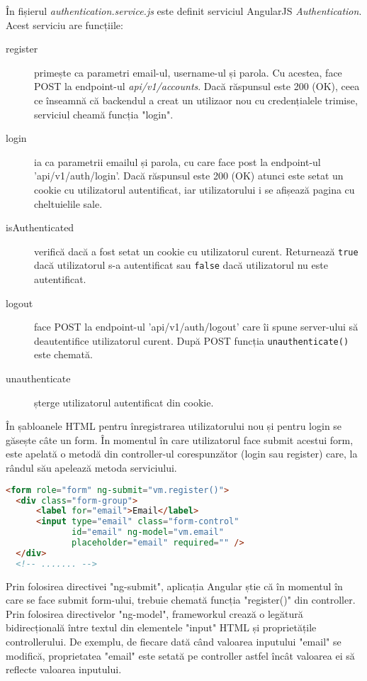 În fișierul \emph{authentication.service.js} este definit serviciul
AngularJS \emph{Authentication}. Acest serviciu are funcțiile:
\begin{description}
\item [register] primește ca parametri email-ul, username-ul și
parola. Cu acestea, face POST la endpoint-ul \emph{api/v1/accounts}.
Dacă răspunsul este 200 (OK), ceea ce înseamnă că backendul
a creat un utilizaor nou cu credențialele trimise,
serviciul cheamă funcția "login".
\item [login] ia ca parametrii emailul și parola, cu care
face post la endpoint-ul 'api/v1/auth/login'. Dacă răspunsul este
200 (OK) atunci este setat un cookie cu utilizatorul autentificat,
iar utilizatorului i se afișează pagina cu cheltuielile sale.
\item [isAuthenticated] verifică dacă a fost setat
un cookie cu utilizatorul curent. Returnează \texttt{true} dacă 
utilizatorul s-a autentificat sau \texttt{false} dacă utilizatorul
nu este autentificat.
\item [logout] face POST la endpoint-ul 'api/v1/auth/logout' care îi
spune server-ului să deautentifice utilizatorul curent. După POST 
funcția \texttt{unauthenticate()} este chemată.
\item [unauthenticate] șterge utilizatorul autentificat din cookie.
\end{description}



În șabloanele HTML pentru înregistrarea utilizatorului nou și pentru
login se găsește câte un form. În momentul în care utilizatorul face
submit acestui form, este apelată o metodă din controller-ul corespunzător
(login sau register) care, la rândul său apelează metoda serviciului.

\begin{lstlisting}[language=html, title=static/templates/authentication/register.html]
<form role="form" ng-submit="vm.register()">
  <div class="form-group">
      <label for="email">Email</label>
      <input type="email" class="form-control" 
             id="email" ng-model="vm.email"
             placeholder="email" required="" />
  </div>
  <!-- ....... -->
\end{lstlisting}

Prin folosirea directivei "ng-submit", aplicația Angular știe
că în momentul în care se face submit form-ului, trebuie
chemată funcția "register()" din controller. Prin folosirea
directivelor "ng-model", frameworkul crează o legătură
bidirecțională între textul din elementele "input" HTML
și proprietățile controllerului. De exemplu, de fiecare
dată când valoarea inputului "email" se modifică,
proprietatea "email" este setată pe controller astfel încât
valoarea ei să reflecte valoarea inputului.


